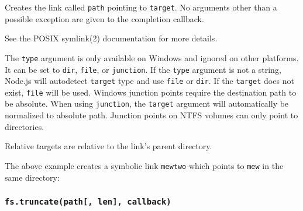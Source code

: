 Creates the link called \texttt{path} pointing to \texttt{target}. No
arguments other than a possible exception are given to the completion
callback.

See the POSIX symlink(2) documentation for more details.

The \texttt{type} argument is only available on Windows and ignored on
other platforms. It can be set to
\texttt{\textquotesingle{}dir\textquotesingle{}},
\texttt{\textquotesingle{}file\textquotesingle{}}, or
\texttt{\textquotesingle{}junction\textquotesingle{}}. If the
\texttt{type} argument is not a string, Node.js will autodetect
\texttt{target} type and use
\texttt{\textquotesingle{}file\textquotesingle{}} or
\texttt{\textquotesingle{}dir\textquotesingle{}}. If the \texttt{target}
does not exist, \texttt{\textquotesingle{}file\textquotesingle{}} will
be used. Windows junction points require the destination path to be
absolute. When using
\texttt{\textquotesingle{}junction\textquotesingle{}}, the
\texttt{target} argument will automatically be normalized to absolute
path. Junction points on NTFS volumes can only point to directories.

Relative targets are relative to the link's parent directory.

\begin{Shaded}
\begin{Highlighting}[]
 \OperatorTok{;}

\NormalTok{(}\OperatorTok{,} \OperatorTok{,}\OperatorTok{;}
\end{Highlighting}
\end{Shaded}

The above example creates a symbolic link \texttt{mewtwo} which points
to \texttt{mew} in the same directory:

\begin{Shaded}
\begin{Highlighting}[]
\ExtensionTok{$}
\AttributeTok{{-}}\OperatorTok{\textgreater{}}
\end{Highlighting}
\end{Shaded}

\subsubsection{\texorpdfstring{\texttt{fs.truncate(path{[},\ len{]},\ callback)}}{fs.truncate(path{[}, len{]}, callback)}}\label{fs.truncatepath-len-callback}

